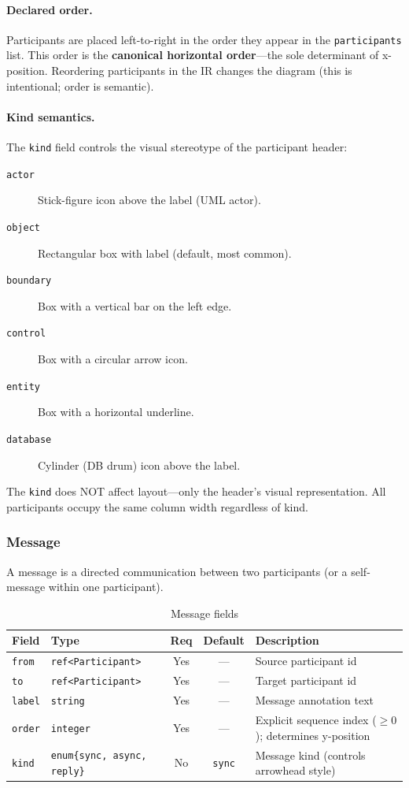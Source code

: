 \paragraph{Declared order.}
Participants are placed left-to-right in the order they appear in the \texttt{participants} list. This order is the \textbf{canonical horizontal order}---the sole determinant of x-position. Reordering participants in the IR changes the diagram (this is intentional; order is semantic).

\paragraph{Kind semantics.}
The \texttt{kind} field controls the visual stereotype of the participant header:
\begin{description}
  \item[\texttt{actor}] Stick-figure icon above the label (UML actor).
  \item[\texttt{object}] Rectangular box with label (default, most common).
  \item[\texttt{boundary}] Box with a vertical bar on the left edge.
  \item[\texttt{control}] Box with a circular arrow icon.
  \item[\texttt{entity}] Box with a horizontal underline.
  \item[\texttt{database}] Cylinder (DB drum) icon above the label.
\end{description}

The \texttt{kind} does NOT affect layout---only the header's visual representation. All participants occupy the same column width regardless of kind.

\subsubsection{Message}
\label{sec:seq-message}

A message is a directed communication between two participants (or a self-message within one participant).

\begin{table}[h]
\centering
\small
\begin{tabular}{llccp{4.0cm}}
\toprule
\textbf{Field} & \textbf{Type} & \textbf{Req} & \textbf{Default} & \textbf{Description} \\
\midrule
\texttt{from} & \texttt{ref<Participant>} & Yes & --- & Source participant id \\
\texttt{to} & \texttt{ref<Participant>} & Yes & --- & Target participant id \\
\texttt{label} & \texttt{string} & Yes & --- & Message annotation text \\
\texttt{order} & \texttt{integer} & Yes & --- & Explicit sequence index ($\ge 0$); determines y-position \\
\texttt{kind} & \texttt{enum\{sync, async, reply\}} & No & \texttt{sync} & Message kind (controls arrowhead style) \\
\bottomrule
\end{tabular}
\caption{Message fields}
\label{tab:seq-message-fields}
\end{table}

